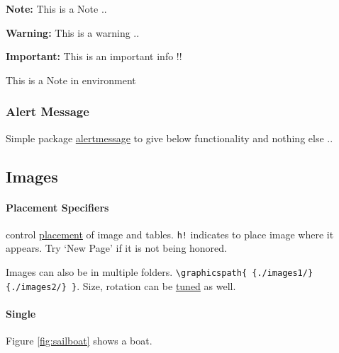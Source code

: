 \documentclass{report}[a4paper,12pt] %
\begin{document}
\newcommand{\note}[1]{\begin{noteBox} \textbf{Note:} #1 \end{noteBox}}
\newcommand{\warning}[1]{\begin{hintBox} \textbf{Warning:} #1 \end{hintBox}}
\newcommand{\important}[1]{\begin{importantBox} \textbf{Important:} #1 \end{importantBox}}

\note{This is a Note ..}
\warning{This is a warning ..}
\important{This is an important info !!}

\begin{noteBox}
  This is a Note in environment
\end{noteBox}

\subsubsection{Alert Message}

Simple package \href{https://www.ctan.org/pkg/alertmessage}{alertmessage} to give below
functionality and nothing else ..


\newpage
\subsection{Images}

\paragraph{Placement Specifiers} control \href{https://www.overleaf.com/learn/latex/Positioning_images_and_tables#The_figure_environment}{placement} of image and tables.
\verb|h!| indicates to place image where it appears. Try `New Page' if it is not being honored.

Images can also be in multiple folders. \verb|\graphicspath{ {./images1/}{./images2/} }|.
Size, rotation can be \href{https://www.overleaf.com/learn/latex/Inserting_Images}{tuned} as well.

\paragraph{Single}

Figure \ref{fig:sailboat} shows a boat. %
\end{document}
